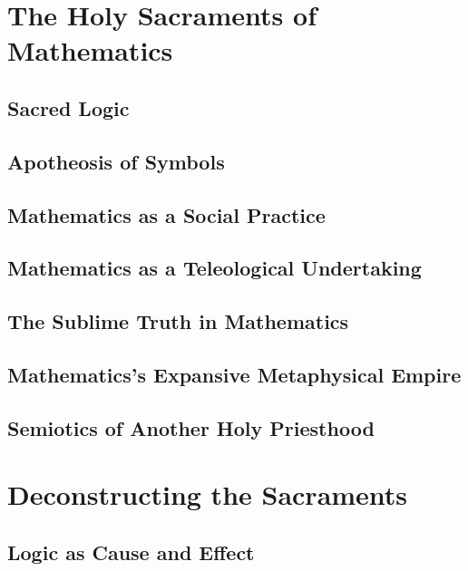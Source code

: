 \documentclass{article}
\begin{document}
	\section{The Holy Sacraments of Mathematics}
	\subsection{Sacred Logic}
	\subsection{Apotheosis of Symbols}
	\subsection{Mathematics as a Social Practice}
	\subsection{Mathematics as a Teleological Undertaking}
	\subsection{The Sublime Truth in Mathematics}
	\subsection{Mathematics's Expansive Metaphysical Empire}
	\subsection{Semiotics of Another Holy Priesthood}
	\section{Deconstructing the Sacraments}
	\subsection{Logic as Cause and Effect}
	
	
\end{document}
